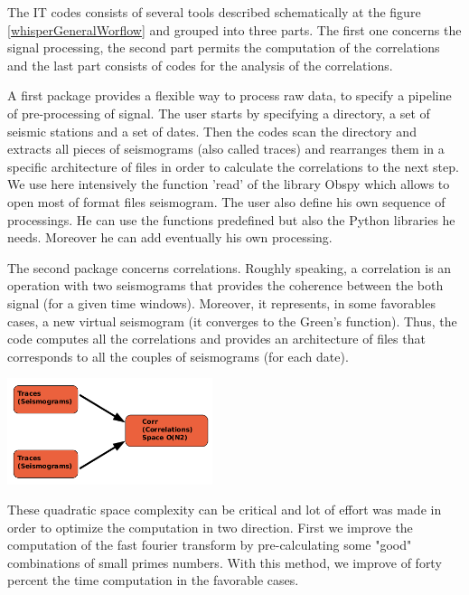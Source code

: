\documentclass[a4paper, 10pt]{article}
\begin{document}
\begin{multicols}{2}
The IT codes consists of several tools described schematically at the figure \ref{whisperGeneralWorflow} and grouped into three parts. The first one concerns the signal processing, the second part permits the computation of the correlations and the last part consists of codes for the analysis of the correlations.

A first package provides a flexible way to process raw data, to specify a pipeline of pre-processing of signal.
The user starts by specifying a directory, a set of seismic stations and a set of dates. Then the codes scan the directory
and extracts all pieces of seismograms (also called traces) and rearranges them in a specific architecture of files in order to calculate the correlations to the next step.
We use here intensively the function 'read' of the library Obspy which allows to open most of format files seismogram.
The user also define his own sequence of processings. He can use the functions predefined but also the Python libraries he needs. 
Moreover he can add eventually his own processing.

The second package concerns correlations. Roughly speaking, a correlation is an operation with two seismograms that provides the coherence between the both signal (for a given time windows). Moreover, it represents, in some favorables cases, a new virtual seismogram (it converges to the Green's function). Thus, the code computes all the correlations and provides an architecture of files that corresponds to all the couples of seismograms (for each date). 

\begin{center}%
\centering
{}
\includegraphics[width=6cm]{schemaCorrelationStep.png}
\end{center}

These quadratic space complexity can be critical and lot of effort was made in order to optimize the computation in two direction. First we improve the computation of the fast fourier transform by pre-calculating some "good" combinations of small primes numbers. 
With this method, we improve of forty percent the time computation in the favorable cases.


\end{multicols}
\end{document}
